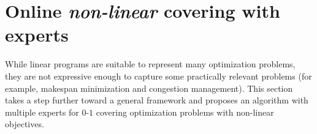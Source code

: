 
\section{Online \emph{non-linear} covering with experts} \label{sec:convex}

While linear programs are suitable to represent many optimization problems, they are not expressive enough to capture some practically relevant problems (for example, makespan minimization and congestion management). This section takes a step further toward a general framework and proposes an algorithm with multiple experts for $0$-$1$ covering optimization problems with non-linear objectives.


